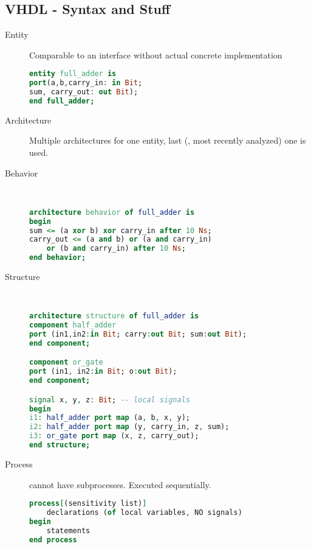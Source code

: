 \subsection{VHDL - Syntax and Stuff}
\begin{description}
	\item[Entity] Comparable to an interface without actual concrete implementation
	\begin{lstlisting}[language=vhdl]
entity full_adder is
port(a,b,carry_in: in Bit;
sum, carry_out: out Bit);
end full_adder;
	\end{lstlisting}

	\item[Architecture] Multiple architectures for one entity, last (\ie, most
	recently analyzed) one is used.
	\item[Behavior]\ 
	\begin{lstlisting}[language=vhdl]
architecture behavior of full_adder is
begin
sum <= (a xor b) xor carry_in after 10 Ns;
carry_out <= (a and b) or (a and carry_in) 
	or (b and carry_in) after 10 Ns;
end behavior;
	\end{lstlisting}

	\item[Structure]\ 
	\begin{lstlisting}[language=vhdl]
architecture structure of full_adder is 
component half_adder
port (in1,in2:in Bit; carry:out Bit; sum:out Bit); 
end component; 

component or_gate
port (in1, in2:in Bit; o:out Bit);
end component;

signal x, y, z: Bit; -- local signals
begin
i1: half_adder port map (a, b, x, y);
i2: half_adder port map (y, carry_in, z, sum); 
i3: or_gate port map (x, z, carry_out);
end structure;
	\end{lstlisting}
	
	\item[Process] cannot have subprocesses. Executed sequentially.
	\begin{lstlisting}[language=vhdl]
process[(sensitivity list)]
	declarations (of local variables, NO signals)
begin
	statements
end process
	\end{lstlisting}


\end{description}
